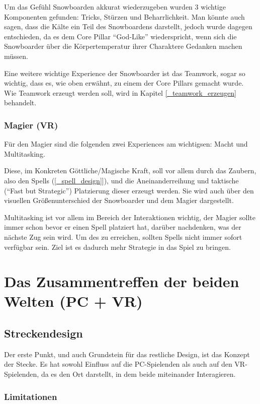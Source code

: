 Um das Gefühl Snowboarden akkurat wiederzugeben wurden 3 wichtige Komponenten gefunden: Tricks, Stürzen und Beharrlichkeit. Man könnte auch sagen, dass die Kälte ein Teil des Snowboardens darstellt, jedoch wurde dagegen entschieden, da es dem Core Pillar "`God-Like"' wiederspricht, wenn sich die Snowboarder über die Körpertemperatur ihrer Charaktere Gedanken machen müssen.

Eine weitere wichtige Experience der Snowboarder ist das Teamwork, sogar so wichtig, dass es, wie oben erwähnt, zu einem der Core Pillars gemacht wurde. Wie Teamwork erzeugt werden soll, wird in Kapitel \ref{_teamwork_erzeugen} behandelt.

\subsubsection{Magier (VR)}

Für den Magier sind die folgenden zwei Experiences am wichtigsen: Macht und Multitasking. 

Diese, im Konkreten Göttliche/Magische Kraft, soll vor allem durch das Zaubern, also den Spells (\ref{_spell_design}]), und die Aneinanderreihung und taktische ("`Fast but Strategic"') Platzierung dieser erzeugt werden. Sie wird auch über den visuellen Größenunterschied der Snowboarder und dem Magier dargestellt.

Multitasking ist vor allem im Bereich der Interaktionen wichtig, der Magier sollte immer schon bevor er einen Spell platziert hat, darüber nachdenken, was der nächste Zug sein wird. Um des zu erreichen, sollten Spells nicht immer sofort verfügbar sein. Ziel ist es dadurch mehr Strategie in das Spiel zu bringen.

\section{Das Zusammentreffen der beiden Welten (PC + VR)}

\subsection{Streckendesign}

Der erste Punkt, und auch Grundstein für das restliche Design, ist das Konzept der Stecke. Es hat sowohl Einfluss auf die PC-Spielenden als auch auf den VR-Spielenden, da es den Ort darstellt, in dem beide miteinander Interagieren.

\subsubsection{Limitationen}

